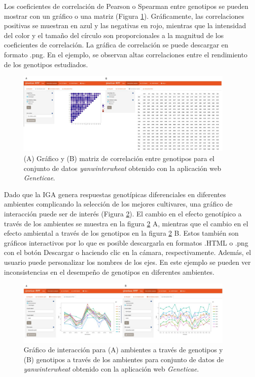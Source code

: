 Los coeficientes de correlación de Pearson o Spearman entre genotipos se pueden mostrar con un gráfico o una matriz (Figura \ref{fig:figdesc2}). Gráficamente, las correlaciones positivas se muestran en azul y las negativas en rojo, mientras que la intensidad del color y el tamaño del círculo son proporcionales a la magnitud de los coeficientes de correlación. La gráfica de correlación se puede descargar en formato .png. En el ejemplo, se observan altas correlaciones entre el rendimiento de los genotipos estudiados. 

\begin{figure}[H]
	\begin{center}
		\includegraphics[width=0.95\textwidth]{./Graficos/correlacion.jpg}
	\end{center}
	\caption{(A) Gráfico y (B) matriz de correlación entre genotipos para el conjunto de datos \emph{yanwinterwheat} obtenido con la aplicación web \emph{Geneticae}.}
	\label{fig:figdesc2}
\end{figure}


Dado que la IGA genera respuestas genotípicas diferenciales en diferentes ambientes complicando la selección de los mejores cultivares, una gráfico de interacción puede ser de interés (Figura \ref{fig:figdesc3}). El cambio en el efecto genotípico a través de los ambientes se muestra en la figura \ref{fig:figdesc3} A, mientras que el cambio en el efecto ambiental a través de los genotipos en la figura \ref{fig:figdesc3} B. Estos también son gráficos interactivos por lo que es posible descargarla en formatos .HTML o .png con el botón Descargar o haciendo clic en la cámara, respectivamente. Además, el usuario puede personalizar los nombres de los ejes. En este ejemplo se pueden ver inconsistencias en el desempeño de genotipos en diferentes ambientes. 


\begin{figure}[H]
	\begin{center}
		\includegraphics[width=0.95\textwidth]{./Graficos/interaction.jpg}
	\end{center}
	\caption{Gráfico de interacción para (A) ambientes a través de genotipos y (B) genotipos a través de los ambientes para conjunto de datos de \emph{yanwinterwheat} obtenido con la aplicación web \emph{Geneticae}.}
	\label{fig:figdesc3}
\end{figure}


